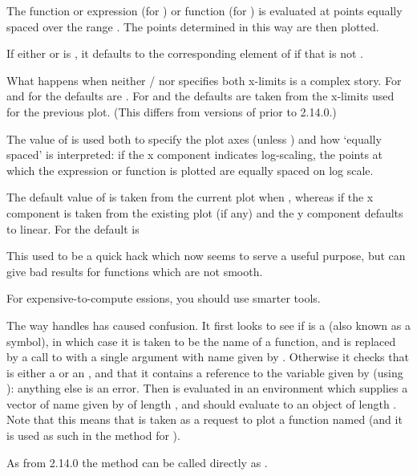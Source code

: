 \begin{Details}\relax
The function or expression  (for ) or function
 (for ) is evaluated at  points equally
spaced over the range \code{[from, to]}.  The points determined in
this way are then plotted.

If either  or  is , it defaults to the
corresponding element of  if that is not .

What happens when neither / nor 
specifies both x-limits is a complex story.  For
 and for  the defaults
are .  For  and  the defaults are taken from the x-limits used for the previous
plot.  (This differs from versions of \R{} prior to 2.14.0.)

The value of  is used both to specify the plot axes (unless
) and how `equally spaced' is interpreted: if
the x component indicates log-scaling, the points at which the
expression or function is plotted are equally spaced on log scale.

The default value of  is taken from the current plot when
, whereas if  the x component is taken
from the existing plot (if any) and the y component defaults to
linear.  For  the default is 

This used to be a quick hack which now seems to serve a useful purpose,
but can give bad results for functions which are not smooth.

For expensive-to-compute essions, you should use smarter tools.

The way  handles  has caused confusion.  It
first looks to see if  is a  (also known as a
symbol), in which case it is taken to be the name of a function, and
 is replaced by a call to  with a single
argument with name given by .  Otherwise it checks that
 is either a  or an , and that
it contains a reference to the variable given by  (using
): anything else is an error.  Then 
is evaluated in an environment which supplies a vector of name given
by  of length , and should evaluate to an object
of length .  Note that this means that  is
taken as a request to plot a function named  (and it is used
as such in the  method for ).

As from \R{} 2.14.0 the  method can be called directly as
.
\end{Details}
